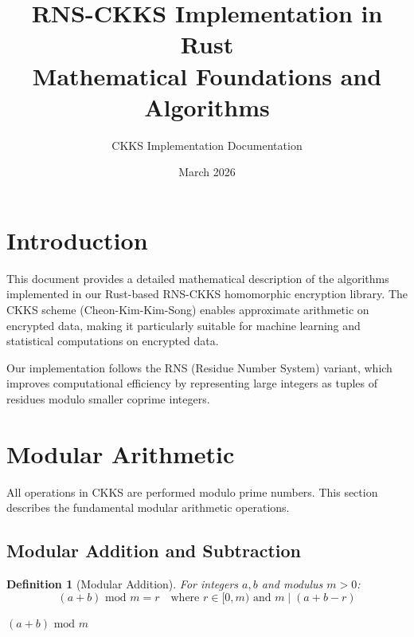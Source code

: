 \documentclass[11pt,a4paper]{article}
\title{\textbf{RNS-CKKS Implementation in Rust}\\[0.5em]
\large Mathematical Foundations and Algorithms}
\author{CKKS Implementation Documentation}
\date{March 2026}
\newtheorem{definition}{Definition}
\newcommand{\bmod}{\text{ mod }}
\begin{document}
\maketitle

\tableofcontents
\newpage

\section{Introduction}

This document provides a detailed mathematical description of the algorithms implemented in our Rust-based RNS-CKKS homomorphic encryption library. The CKKS scheme (Cheon-Kim-Kim-Song) enables approximate arithmetic on encrypted data, making it particularly suitable for machine learning and statistical computations on encrypted data.

Our implementation follows the RNS (Residue Number System) variant, which improves computational efficiency by representing large integers as tuples of residues modulo smaller coprime integers.

\section{Modular Arithmetic}

All operations in CKKS are performed modulo prime numbers. This section describes the fundamental modular arithmetic operations.

\subsection{Modular Addition and Subtraction}

\begin{definition}[Modular Addition]
For integers $a, b$ and modulus $m > 0$:
\[
(a + b) \bmod m = r \quad \text{where } r \in [0, m) \text{ and } m \mid (a + b - r)
\]
\end{definition}

\begin{algorithm}[H]
\caption{Modular Addition}
\begin{algorithmic}[1]
    \State \Return $(a + b) \bmod m$
\EndFunction
\end{algorithmic}
\end{algorithm}
\end{document}
